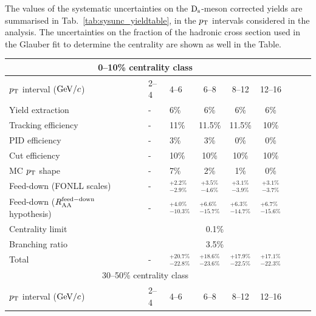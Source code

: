 The values of the systematic uncertainties on the ${\rm D_s}$-meson corrected yields
are summarised in Tab.~\ref{tab:sysunc_yieldtable}, in the $p_{\rm T}$ intervals considered in 
the analysis. The uncertainties on the fraction of the hadronic cross section used in the Glauber fit to determine
the centrality are shown as well in the Table.
\begin{table}[!h]
\centering
\begin{tabular}{|l|l|l|c|c|c|c|c|c|}
\hline
\multicolumn{6}{|c|}{0--10\% centrality class}       \\                                                                                                                                                                                                                                               \hline
$p_{\rm T}$ interval ($\mathrm{GeV}/c$) & 2--4        &    4--6          & 6--8      &   8--12            & 12--16                  \\ 
\hline
Yield extraction & - & 6\% & 6\%& 6\%& 6\%\\
Tracking efficiency & -  & 11\% &11.5\% &11.5\% & 10\% \\
PID efficiency & -  & 3\%& 3\% & 0\%&  0\%\\
Cut efficiency & -  & 10\%& 10\%& 10\%& 10\%\\
MC $p_{\rm T}$ shape & -  & 7\%& 2\%& 1\%& 0\% \\
Feed-down (FONLL scales) & -  & $^{+2.2\%}_{-2.9\%}$ &$ ^{+3.5\%}_{-4.6\%} $& $^{+3.1\%}_{-3.9\%}$& $^{+3.1\%}_{-3.7\%}$\\
Feed-down ($R_{\rm AA}^{\rm feed-down}$ hypothesis)  & - & $^{+4.0\%}_{-10.3\%}$& $^{+6.6\%}_{-15.7\%} $&$ ^{+6.3\%}_{-14.7\%}$ & $^{+6.7\%}_{-15.6\%} $\\
\hline
Centrality limit & \multicolumn{5}{c|}{0.1\%}  \\
\hline
\hline
Branching ratio & \multicolumn{5}{c|}{3.5\%}  \\
\hline
\hline
Total  & - & $^{+20.7\%}_{-22.8\%}$& $^{+18.6\%}_{-23.6\%}$ & $^{+17.9\%}_{-22.5\%}$ & $^{+17.1\%}_{-22.3\%}$  \\
\hline
\hline
\multicolumn{6}{|c|}{30--50\% centrality class}       \\                                                                                                                                                                                                                                               \hline
$p_{\rm T}$ interval ($\mathrm{GeV}/c$)   & 2--4     &    4--6          & 6--8      &   8--12            & 12--16                  \\ 

\end{tabular}
\end{table}
